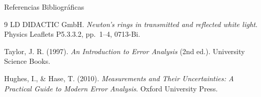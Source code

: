 \documentclass[aspectratio=169]{beamer}
\begin{document}
\begin{frame}{Referencias Bibliográficas}
    \begin{thebibliography}{9}
        LD DIDACTIC GmbH. 
        \textit{Newton's rings in transmitted and reflected white light}. 
        Physics Leaflets P5.3.3.2, pp.~1--4, 0713-Bi.
        
        Taylor, J. R. (1997). 
        \textit{An Introduction to Error Analysis} (2nd ed.). University Science Books.
        
        Hughes, I., \& Hase, T. (2010). 
        \textit{Measurements and Their Uncertainties: A Practical Guide to Modern Error Analysis}. Oxford University Press.
    \end{thebibliography}
\end{frame}

\begin{frame}[plain]
\end{frame}
\end{document}
